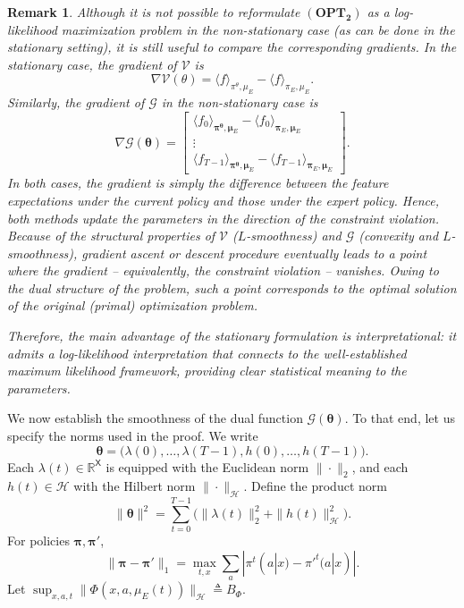 \documentclass[11pt]{article}
\newcommand{\bmu}{{\boldsymbol \mu}}
\newcommand{\bpi}{{\boldsymbol \pi}}
\newcommand{\btheta}{{\boldsymbol \theta}}
\newcommand{\sX}{{\mathsf X}}
\newcommand{\V}{{\mathcal V}}
\newcommand{\cG}{{\mathcal G}}
\newtheorem{remark}{Remark}
\begin{document}
\begin{remark}
Although it is not possible to reformulate \(\mathbf{(OPT_2)}\) as a log-likelihood maximization problem in the non-stationary case (as can be done in the stationary setting), it is still useful to compare the corresponding gradients. In the stationary case, the gradient of \(\mathcal V\) is
$$
\nabla \V(\theta) = \langle f \rangle_{\pi^{\theta},\mu_E} - \langle f \rangle_{\pi_E,\mu_E}.
$$
Similarly, the gradient of \(\mathcal G\) in the non-stationary case is
$$
\nabla \cG(\btheta) = \begin{bmatrix} \langle f_0 \rangle_{\bpi^{\btheta},\bmu_E} - \langle f_0 \rangle_{\bpi_E,\bmu_E} \\ \vdots \\ \langle f_{T-1} \rangle_{\bpi^{\btheta},\bmu_E} - \langle f_{T-1} \rangle_{\bpi_E,\bmu_E} \end{bmatrix}.
$$
In both cases, the gradient is simply the difference between the feature expectations under the current policy and those under the expert policy. Hence, both methods update the parameters in the direction of the constraint violation. Because of the structural properties of \(\mathcal V\) ($L$-smoothness) and \(\mathcal G\) (convexity and $L$-smoothness), gradient ascent or descent procedure eventually leads to a point where the gradient -- equivalently, the constraint violation -- vanishes. Owing to the dual structure of the problem, such a point corresponds to the optimal solution of the original (primal) optimization problem.

Therefore, the main advantage of the stationary formulation is interpretational: it admits a log-likelihood interpretation that connects to the well-established maximum likelihood framework, providing clear statistical meaning to the parameters.
\end{remark}


We now establish the smoothness of the dual function $\mathcal G(\boldsymbol\theta)$. To that end, let us specify the norms used in the proof. We write
\[
\boldsymbol\theta
=
\big(\lambda(0),\ldots,\lambda(T-1),
h(0),\ldots,h(T-1)\big).
\]
Each $\lambda(t)\in\mathbb R^{\sX}$ is equipped with the Euclidean norm $\|\cdot\|_2$, and each $h(t)\in\mathcal H$ with the Hilbert norm $\|\cdot\|_{\mathcal H}$. Define the product norm
\[
\|\boldsymbol\theta\|^2
=
\sum_{t=0}^{T-1}
\Big(
\|\lambda(t)\|_2^2
+
\|h(t)\|_{\mathcal H}^2
\Big).
\]
For policies $\bpi,\bpi'$,
\[
\|\bpi-\bpi'\|_{1}
=
\max_{t,x}
\sum_{a}
|\pi^t(a|x)-\pi'^t(a|x)|.
\]
Let
$
\sup_{x,a,t}
\|\Phi(x,a,\mu_E(t))\|_{\mathcal H}
\triangleq
B_\Phi.
$
\end{document}
